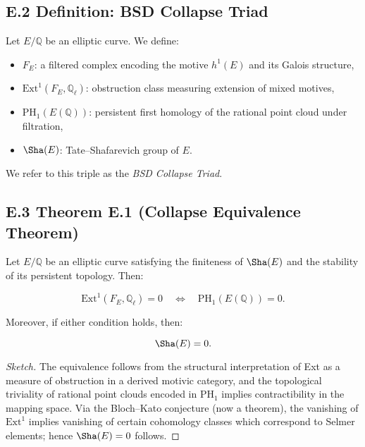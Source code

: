 \subsection*{E.2 Definition: BSD Collapse Triad}

Let \( E/\mathbb{Q} \) be an elliptic curve. We define:

\begin{itemize}
  \item \( F_E \): a filtered complex encoding the motive \( h^1(E) \) and its Galois structure,
  \item \( \mathrm{Ext}^1(F_E, \mathbb{Q}_\ell) \): obstruction class measuring extension of mixed motives,
  \item \( \mathrm{PH}_1(E(\mathbb{Q})) \): persistent first homology of the rational point cloud under filtration,
  \item \( \Sha(E) \): Tate--Shafarevich group of \( E \).
\end{itemize}

We refer to this triple as the \emph{BSD Collapse Triad}.

\subsection*{E.3 Theorem E.1 (Collapse Equivalence Theorem)}

\begin{theorem}
Let \( E/\mathbb{Q} \) be an elliptic curve satisfying the finiteness of \( \Sha(E) \) and the stability of its persistent topology. Then:

\[
\mathrm{Ext}^1(F_E, \mathbb{Q}_\ell) = 0 \quad \Longleftrightarrow \quad \mathrm{PH}_1(E(\mathbb{Q})) = 0.
\]

Moreover, if either condition holds, then:

\[
\Sha(E) = 0.
\]
\end{theorem}

\begin{proof}[Sketch]
The equivalence follows from the structural interpretation of Ext as a measure of obstruction in a derived motivic category,  
and the topological triviality of rational point clouds encoded in \( \mathrm{PH}_1 \) implies contractibility in the mapping space.  
Via the Bloch--Kato conjecture (now a theorem), the vanishing of \( \mathrm{Ext}^1 \) implies vanishing of certain cohomology classes  
which correspond to Selmer elements; hence \( \Sha(E) = 0 \) follows.
\end{proof}

